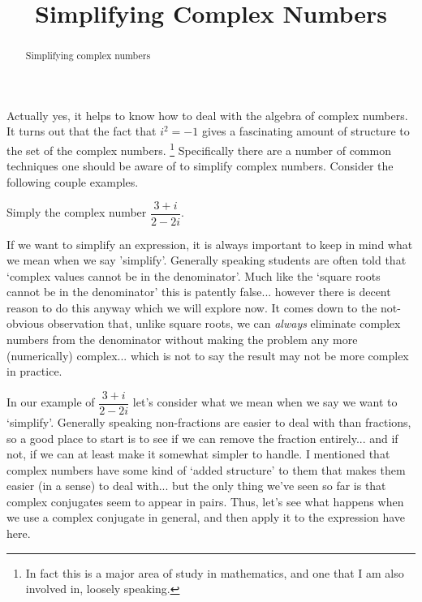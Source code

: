 \documentclass{ximeraXloud}
\title{Simplifying Complex Numbers}
\begin{document}
\begin{abstract}
    Simplifying complex numbers
\end{abstract}
\maketitle


Actually yes, it helps to know how to deal with the algebra of complex numbers. It turns out that the fact that $i^2 = -1$ gives a fascinating amount of structure to the set of the complex numbers.%
\footnote{In fact this is a major area of study in mathematics, and one that I am also involved in, loosely speaking.}
Specifically there are a number of common techniques one should be aware of to simplify complex numbers. Consider the following couple examples.

\begin{example}%
    Simply the complex number $\dfrac{3 + i}{2 - 2i}$.
    
    If we want to simplify an expression, it is always important to keep in mind what we mean when we say 'simplify'. Generally speaking students are often told that `complex values cannot be in the denominator'. Much like the `square roots cannot be in the denominator' this is patently false... however there is decent reason to do this anyway which we will explore now. It comes down to the not-obvious observation that, unlike square roots, we can \textit{always} eliminate complex numbers from the denominator without making the problem any more (numerically) complex... which is not to say the result may not be more complex in practice.
    
    In our example of $\dfrac{3 + i}{2 - 2i}$ let's consider what we mean when we say we want to `simplify'. Generally speaking non-fractions are easier to deal with than fractions, so a good place to start is to see if we can remove the fraction entirely... and if not, if we can at least make it somewhat simpler to handle. I mentioned that complex numbers have some kind of `added structure' to them that makes them easier (in a sense) to deal with... but the only thing we've seen so far is that complex conjugates seem to appear in pairs. Thus, let's see what happens when we use a complex conjugate in general, and then apply it to the expression have here.
    

\end{example}
\end{document}
